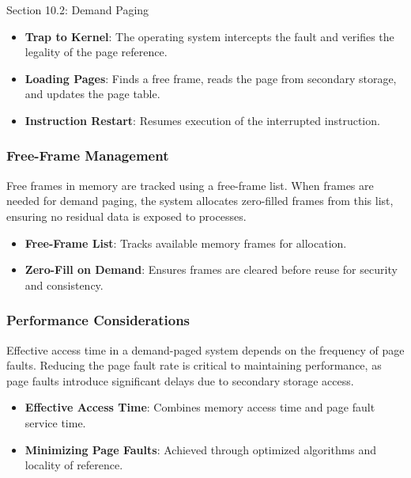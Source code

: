 \begin{notes}{Section 10.2: Demand Paging}
    \begin{highlight}
    \begin{itemize}
        \item \textbf{Trap to Kernel}: The operating system intercepts the fault and verifies the legality of the page reference.
        \item \textbf{Loading Pages}: Finds a free frame, reads the page from secondary storage, and updates the page table.
        \item \textbf{Instruction Restart}: Resumes execution of the interrupted instruction.
    \end{itemize}
    \end{highlight}
    
    \subsubsection*{Free-Frame Management}
    
    Free frames in memory are tracked using a free-frame list. When frames are needed for demand paging, the system allocates zero-filled frames from this list, ensuring no residual data is exposed to processes.
    
    \begin{highlight}
    \begin{itemize}
        \item \textbf{Free-Frame List}: Tracks available memory frames for allocation.
        \item \textbf{Zero-Fill on Demand}: Ensures frames are cleared before reuse for security and consistency.
    \end{itemize}
    \end{highlight}
    
    \subsubsection*{Performance Considerations}
    
    Effective access time in a demand-paged system depends on the frequency of page faults. Reducing the page fault rate is critical to maintaining performance, as page faults introduce significant delays 
    due to secondary storage access.
    
    \begin{highlight}
    \begin{itemize}
        \item \textbf{Effective Access Time}: Combines memory access time and page fault service time.
        \item \textbf{Minimizing Page Faults}: Achieved through optimized algorithms and locality of reference.
    \end{itemize}
    \end{highlight}
    

\end{notes}
